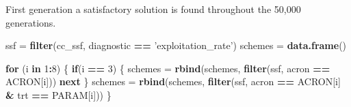 \documentclass[]{book}
\newenvironment{Shaded}{\begin{snugshade}}{\end{snugshade}}
\newcommand{\ControlFlowTok}[1]{\textcolor[rgb]{0.13,0.29,0.53}{\textbf{#1}}}
\newcommand{\DecValTok}[1]{\textcolor[rgb]{0.00,0.00,0.81}{#1}}
\newcommand{\KeywordTok}[1]{\textcolor[rgb]{0.13,0.29,0.53}{\textbf{#1}}}
\newcommand{\NormalTok}[1]{#1}
\newcommand{\OperatorTok}[1]{\textcolor[rgb]{0.81,0.36,0.00}{\textbf{#1}}}
\newcommand{\StringTok}[1]{\textcolor[rgb]{0.31,0.60,0.02}{#1}}
\begin{document}
First generation a satisfactory solution is found throughout the 50,000 generations.

\begin{Shaded}
\begin{Highlighting}[]
\NormalTok{ssf =}\StringTok{ }\KeywordTok{filter}\NormalTok{(cc_ssf, diagnostic }\OperatorTok{==}\StringTok{ 'exploitation_rate'}\NormalTok{)}
\NormalTok{schemes =}\StringTok{ }\KeywordTok{data.frame}\NormalTok{()}

\ControlFlowTok{for}\NormalTok{ (i }\ControlFlowTok{in} \DecValTok{1}\OperatorTok{:}\DecValTok{8}\NormalTok{) \{}
  \ControlFlowTok{if}\NormalTok{(i }\OperatorTok{==}\StringTok{ }\DecValTok{3}\NormalTok{)}
\NormalTok{  \{}
\NormalTok{    schemes =}\StringTok{ }\KeywordTok{rbind}\NormalTok{(schemes, }\KeywordTok{filter}\NormalTok{(ssf, acron }\OperatorTok{==}\StringTok{ }\NormalTok{ACRON[i]))}
    \ControlFlowTok{next}
\NormalTok{  \}}
\NormalTok{  schemes =}\StringTok{ }\KeywordTok{rbind}\NormalTok{(schemes, }\KeywordTok{filter}\NormalTok{(ssf, acron }\OperatorTok{==}\StringTok{ }\NormalTok{ACRON[i] }\OperatorTok{&}\StringTok{ }\NormalTok{trt }\OperatorTok{==}\StringTok{ }\NormalTok{PARAM[i]))}
\NormalTok{\}}


\end{Highlighting}
\end{Shaded}
\end{document}
